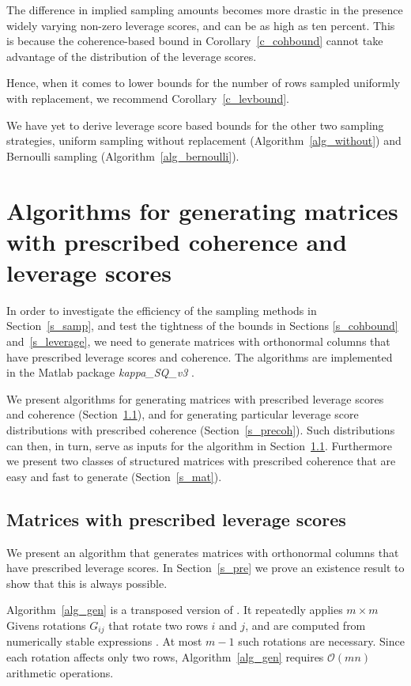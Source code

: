 \documentclass{siamltex}
\begin{document}
The difference in implied sampling amounts becomes more drastic in the 
presence widely varying non-zero leverage scores,
and can be as high as ten percent. This is because the coherence-based 
bound in Corollary~\ref{c_cohbound} cannot take advantage of the distribution
of the leverage scores.

Hence, when it comes to lower bounds for the number of rows sampled
uniformly with replacement, we recommend Corollary~\ref{c_levbound}. 

We have yet to derive leverage score based bounds for the
other two sampling strategies, uniform sampling without replacement 
(Algorithm~\ref{alg_without}) and Bernoulli sampling 
(Algorithm~\ref{alg_bernoulli}).

 

\section{Algorithms for generating matrices with prescribed
coherence and leverage scores}\label{s_genalg}
In order to investigate the efficiency of the sampling methods in 
Section~\ref{s_samp}, and test 
the tightness of the bounds in Sections \ref{s_cohbound} and~\ref{s_leverage}, 
we need to generate matrices with 
orthonormal columns that have prescribed leverage scores and coherence. 
The algorithms are implemented in the Matlab 
package \textsl{kappa\_SQ\_v3} \cite{impl}.

We present algorithms for generating matrices with prescribed leverage scores
and coherence (Section~\ref{s_alg}), and for generating
particular leverage score distributions
with prescribed coherence (Section~\ref{s_precoh}).
Such distributions can then, in turn, serve as inputs for the algorithm 
in Section~\ref{s_alg}. Furthermore we present two classes 
of structured matrices with prescribed coherence that are easy and fast 
to generate (Section~\ref{s_mat}). 

\subsection{Matrices with prescribed leverage scores}\label{s_alg}
We present an algorithm that generates matrices
with orthonormal columns that have prescribed leverage scores.
In Section~\ref{s_pre} we prove an existence 
result to show that this is always possible.

Algorithm~\ref{alg_gen} is a transposed version of \cite[Algorithm 3]{DHST05}.
It repeatedly applies $m\times m$ Givens rotations $G_{ij}$
that rotate two rows $i$ and $j$, and are computed from
numerically stable expressions \cite[section 3.1]{DHST05}.
At most $m-1$ such rotations are necessary.
Since each rotation affects only two rows, Algorithm~\ref{alg_gen}
requires $\mathcal{O}(mn)$ arithmetic operations.
\end{document}
